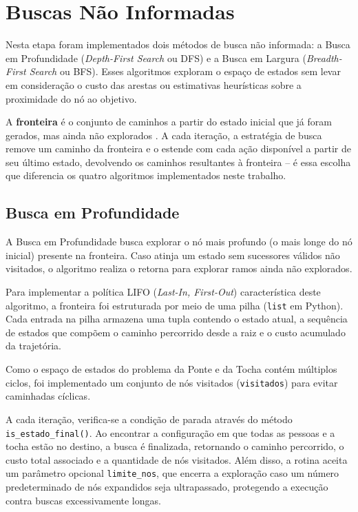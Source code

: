 \section{Buscas Não Informadas}
\label{sec:busca-nao-informada}

Nesta etapa foram implementados dois métodos de busca não informada:
a Busca em Profundidade (\textit{Depth-First Search} ou DFS) e a Busca
em Largura (\textit{Breadth-First Search} ou BFS).
Esses algoritmos exploram o espaço de estados sem levar em consideração o custo das arestas ou estimativas
heurísticas sobre a proximidade do nó ao objetivo.

A \textbf{fronteira} é o conjunto de caminhos a partir do estado inicial que
já foram gerados, mas ainda não explorados \parencite{poole2010}. A cada
iteração, a estratégia de busca remove um caminho da fronteira e o estende
com cada ação disponível a partir de seu último estado, devolvendo os
caminhos resultantes à fronteira -- é essa escolha que diferencia os quatro
algoritmos implementados neste trabalho.

\subsection{Busca em Profundidade}
\label{subsec:dfs}

A Busca em Profundidade busca explorar o nó mais profundo (o mais longe do nó inicial)
presente na fronteira. Caso atinja um estado sem sucessores válidos não visitados, o
algoritmo realiza o retorna para explorar ramos ainda não explorados.

Para implementar a política LIFO (\textit{Last-In, First-Out}) característica deste
algoritmo, a fronteira foi estruturada por meio de uma pilha (\texttt{list} em Python).
Cada entrada na pilha armazena uma tupla contendo o estado atual, a sequência de estados
que compõem o caminho percorrido desde a raiz e o custo acumulado da trajetória.

Como o espaço de estados do problema da Ponte e da Tocha contém múltiplos ciclos,
foi implementado um conjunto de nós visitados (\texttt{visitados})
para evitar caminhadas cíclicas.

A cada iteração, verifica-se a condição de parada através do método
\texttt{is\_estado\_final()}. Ao encontrar a configuração em que todas as pessoas e a
tocha estão no destino, a busca é finalizada, retornando o
caminho percorrido, o custo total associado e a quantidade de nós visitados. Além disso,
a rotina aceita um parâmetro opcional \texttt{limite\_nos}, que encerra a exploração
caso um número predeterminado de nós expandidos seja ultrapassado, protegendo a execução
contra buscas excessivamente longas.

